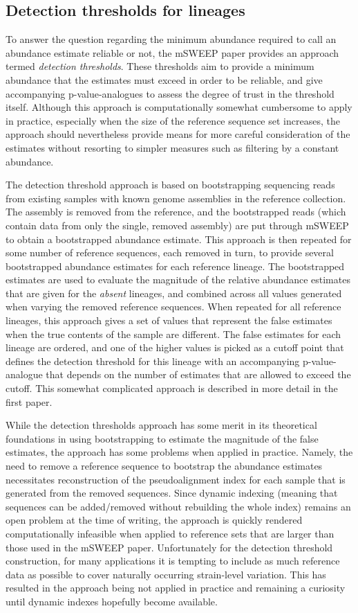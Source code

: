 \documentclass[officiallayout]{tktla}
\begin{document}
\subsection{Detection thresholds for lineages}
To answer the question regarding the minimum abundance required to
call an abundance estimate reliable or not, the mSWEEP paper provides
an approach termed \textit{detection thresholds}. These thresholds aim
to provide a minimum abundance that the estimates must exceed in order
to be reliable, and give accompanying p-value-analogues to assess the
degree of trust in the threshold itself. Although this approach is
computationally somewhat cumbersome to apply in practice, especially
when the size of the reference sequence set increases, the approach
should nevertheless provide means for more careful consideration of
the estimates without resorting to simpler measures such as filtering
by a constant abundance.

The detection threshold approach is based on bootstrapping sequencing
reads from existing samples with known genome assemblies in the
reference collection. The assembly is removed from the reference, and
the bootstrapped reads (which contain data from only the single,
removed assembly) are put through mSWEEP to obtain a bootstrapped
abundance estimate. This approach is then repeated for some number of
reference sequences, each removed in turn, to provide several
bootstrapped abundance estimates for each reference lineage. The
bootstrapped estimates are used to evaluate the magnitude of the
relative abundance estimates that are given for the \textit{absent}
lineages, and combined across all values generated when varying the
removed reference sequences. When repeated for all reference lineages,
this approach gives a set of values that represent the false estimates
when the true contents of the sample are different. The false estimates
for each lineage are ordered, and one of the higher values is picked
as a cutoff point that defines the detection threshold for this
lineage with an accompanying p-value-analogue that depends on the
number of estimates that are allowed to exceed the cutoff. This
somewhat complicated approach is described in more detail in the first
paper.

While the detection thresholds approach has some merit in its
theoretical foundations in using bootstrapping to estimate the
magnitude of the false estimates, the approach has some problems when
applied in practice. Namely, the need to remove a reference sequence
to bootstrap the abundance estimates necessitates reconstruction of the
pseudoalignment index for each sample that is generated from the
removed sequences. Since dynamic indexing (meaning that sequences can
be added/removed without rebuilding the whole index) remains an open
problem at the time of writing, the approach is quickly rendered
computationally infeasible when applied to reference sets that are
larger than those used in the mSWEEP paper. Unfortunately for the
detection threshold construction, for many applications it is tempting
to include as much reference data as possible to cover naturally
occurring strain-level variation. This has resulted in the approach
being not applied in practice and remaining a curiosity until dynamic
indexes hopefully become available.
\end{document}
